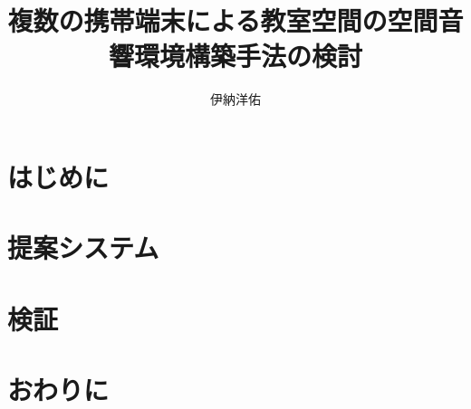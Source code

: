 \documentclass[11pt]{jarticle}
\title{複数の携帯端末による教室空間の空間音響環境構築手法の検討}
\author{伊納洋佑}
\begin{document}
\maketitle

\section{はじめに}


\section{提案システム}


\section{検証}


\section{おわりに}

\end{document}
